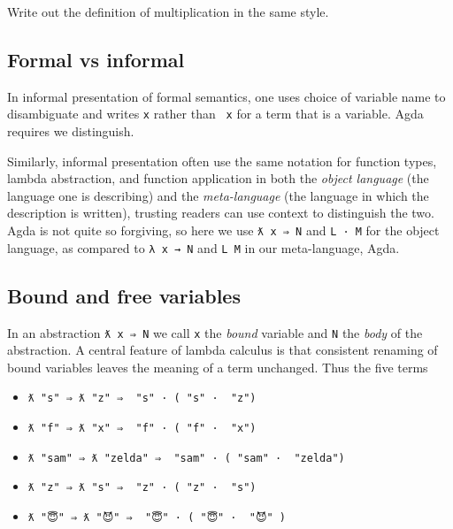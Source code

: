 Write out the definition of multiplication in the same style.

\hypertarget{formal-vs-informal}{%
\subsection{Formal vs informal}\label{formal-vs-informal}}

In informal presentation of formal semantics, one uses choice of
variable name to disambiguate and writes \texttt{x} rather than
\texttt{\textasciigrave{}\ x} for a term that is a variable. Agda
requires we distinguish.

Similarly, informal presentation often use the same notation for
function types, lambda abstraction, and function application in both the
\emph{object language} (the language one is describing) and the
\emph{meta-language} (the language in which the description is written),
trusting readers can use context to distinguish the two. Agda is not
quite so forgiving, so here we use \texttt{ƛ\ x\ ⇒\ N} and
\texttt{L\ ·\ M} for the object language, as compared to
\texttt{λ\ x\ →\ N} and \texttt{L\ M} in our meta-language, Agda.

\hypertarget{bound-and-free-variables}{%
\subsection{Bound and free variables}\label{bound-and-free-variables}}

In an abstraction \texttt{ƛ\ x\ ⇒\ N} we call \texttt{x} the
\emph{bound} variable and \texttt{N} the \emph{body} of the abstraction.
A central feature of lambda calculus is that consistent renaming of
bound variables leaves the meaning of a term unchanged. Thus the five
terms

\begin{itemize}
\tightlist
\item
  \texttt{ƛ\ "s"\ ⇒\ ƛ\ "z"\ ⇒\ \textasciigrave{}\ "s"\ ·\ (\textasciigrave{}\ "s"\ ·\ \textasciigrave{}\ "z")}
\item
  \texttt{ƛ\ "f"\ ⇒\ ƛ\ "x"\ ⇒\ \textasciigrave{}\ "f"\ ·\ (\textasciigrave{}\ "f"\ ·\ \textasciigrave{}\ "x")}
\item
  \texttt{ƛ\ "sam"\ ⇒\ ƛ\ "zelda"\ ⇒\ \textasciigrave{}\ "sam"\ ·\ (\textasciigrave{}\ "sam"\ ·\ \textasciigrave{}\ "zelda")}
\item
  \texttt{ƛ\ "z"\ ⇒\ ƛ\ "s"\ ⇒\ \textasciigrave{}\ "z"\ ·\ (\textasciigrave{}\ "z"\ ·\ \textasciigrave{}\ "s")}
\item
  \texttt{ƛ\ "😇"\ ⇒\ ƛ\ "😈"\ ⇒\ \textasciigrave{}\ "😇"\ ·\ (\textasciigrave{}\ "😇"\ ·\ \textasciigrave{}\ "😈"\ )}
\end{itemize}

